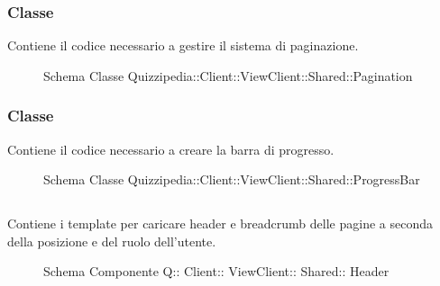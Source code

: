 \subsubsection{Classe }
Contiene il codice necessario a gestire il sistema di paginazione.
\begin{figure}[H]
\centering
\noindent{}
\caption[Schema Classe Pagination]{Schema Classe Quizzipedia::Client::ViewClient::Shared::Pagination}
\end{figure}
\subsubsection{Classe }
Contiene il codice necessario a creare la barra di progresso.
\begin{figure}[H]
\centering
\noindent{}
\caption[Schema Classe ProgressBar]{Schema Classe Quizzipedia::Client::ViewClient::Shared::ProgressBar}
\end{figure}
\subsection{}
Contiene i template per caricare header e breadcrumb delle pagine a seconda della posizione e del ruolo dell'utente.
\begin{figure}[H]
\centering
\noindent{}
\caption[Schema Componente Quizzipedia::Client::ViewClient::Shared::Header]{Schema Componente Q:: Client:: ViewClient:: Shared:: Header}
\end{figure}
